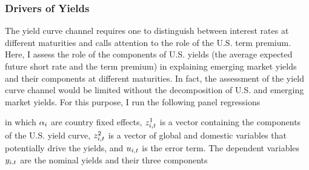 {\subsubsection{Drivers of Yields}
The yield curve channel requires one to distinguish between interest rates at different maturities and calls attention to the role of the U.S. term premium.
Here, I assess the role of the components of U.S. yields (the average expected future short rate and the term premium)
in explaining emerging market yields and their components at different maturities.
In fact, the assessment of the yield curve channel would be limited without the decomposition of U.S. and emerging market yields.
For this purpose, I run the following panel regressions 

\noindent in which \(\alpha_{i}\) are country fixed effects, \(z^{1}_{i,t}\) is a vector containing the components of the U.S. yield curve, \(z^{2}_{i,t}\) is a vector of global and domestic variables that potentially drive the yields, and \(u_{i,t}\) is the error term. 
The dependent variables \(y_{i,t}\) are the nominal yields and their three components 
}

